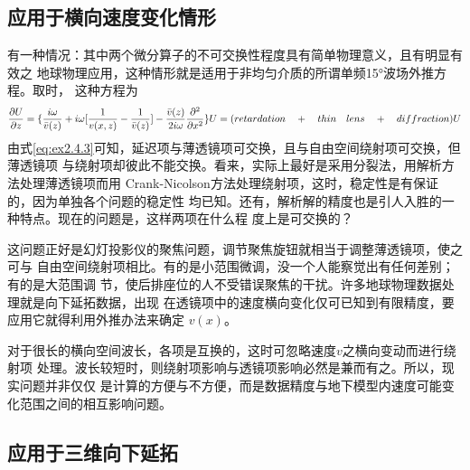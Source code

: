 \subsection{应用于横向速度变化情形}
\label{sec:2.4.4}
有一种情况：其中两个微分算子的不可交换性程度具有简单物理意义，且有明显有效之
地球物理应用，这种情形就是适用于非均匀介质的所谓单频15°波场外推方程。取时，
这种方程为
\begin{equation}
\frac{\partial U}{\partial z}=\{\frac{i\omega}{\bar{v}(z)}+i\omega
[\frac{1}{v(x,z)}-\frac{1}{\bar{v}(z)}]-\frac{\bar{v}(z)}{2i\omega}
\frac{\partial^2}{\partial x^2}\}U\\
=(retardation\quad + \quad thin\quad lens\quad +\quad diffraction)U
\label{eq:ex2.4.3}
\end{equation}
由式\ref{eq:ex2.4.3}可知，延迟项与薄透镜项可交换，且与自由空间绕射项可交换，但薄透镜项
与绕射项却彼此不能交换。看来，实际上最好是采用分裂法，用解析方法处理薄透镜项而用
Crank-Nicolson方法处理绕射项，这时，稳定性是有保证的，因为单独各个问题的稳定性
均已知。还有，解析解的精度也是引人入胜的一种特点。现在的问题是，这样两项在什么程
度上是可交换的？

这问题正好是幻灯投影仪的聚焦问题，调节聚焦旋钮就相当于调整薄透镜项，使之可与
自由空间绕射项相比。有的是小范围微调，没一个人能察觉出有任何差别；有的是大范围调
节，使后排座位的人不受错误聚焦的干扰。许多地球物理数据处理就是向下延拓数据，出现
在透镜项中的速度横向变化仅可已知到有限精度，要应用它就得利用外推办法来确定
$v(x)$。

对于很长的横向空间波长，各项是互换的，这时可忽略速度$v$之横向变动而进行绕射项
处理。波长较短时，则绕射项影响与透镜项影响必然是兼而有之。所以，现实问题并非仅仅
是计算的方便与不方便，而是数据精度与地下模型内速度可能变化范围之间的相互影响问题。

\subsection{应用于三维向下延拓}
\label{sec:2.4.5}


